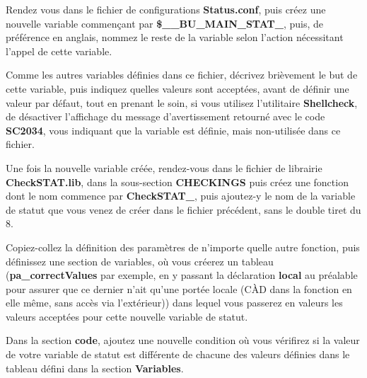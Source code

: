 \documentclass[a4paper,10pt]{article}
\begin{document}
\begin{justify}
    Rendez vous dans le fichier de configurations \textbf{\color{lime}Status.conf}, puis créez une nouvelle variable commençant par \textbf{\color{orange}\$\_\_BU\_MAIN\_STAT\_}, puis, de préférence en anglais, nommez le reste de la variable selon l'action nécessitant l'appel de cette variable.
\end{justify}

\begin{justify}
    Comme les autres variables définies dans ce fichier, décrivez brièvement le but de cette variable, puis indiquez quelles valeurs sont acceptées, avant de définir une valeur par défaut, tout en prenant le soin, si vous utilisez l'utilitaire \textbf{\color{gray}Shellcheck}, de désactiver l'affichage du message d'avertissement retourné avec le code \textbf{SC2034}, vous indiquant que la variable est définie, mais non-utilisée dans ce fichier.
\end{justify}

\begin{justify}
    Une fois la nouvelle variable créée, rendez-vous dans le fichier de librairie \textbf{\color{lime}CheckSTAT.lib}, dans la sous-section \textbf{CHECKINGS} puis créez une fonction dont le nom commence par \textbf{\color{mauve}CheckSTAT\_}, puis ajoutez-y le nom de la variable de statut que vous venez de créer dans le fichier précédent, sans le double tiret du 8.
\end{justify}

\begin{justify}
    Copiez-collez la définition des paramètres de n'importe quelle autre fonction, puis définissez une section de variables, où vous créerez un tableau (\textbf{pa\_correctValues} par exemple, en y passant la déclaration \textbf{\color{gray}local} au préalable pour assurer que ce dernier n'ait qu'une portée locale (CÀD dans la fonction en elle même, sans accès via l'extérieur)) dans lequel vous passerez en valeurs les valeurs acceptées pour cette nouvelle variable de statut.
\end{justify}

\begin{justify}
    Dans la section \textbf{code}, ajoutez une nouvelle condition où vous vérifirez si la valeur de votre variable de statut est différente de chacune des valeurs définies dans le tableau défini dans la section \textbf{Variables}.
\end{justify}
\end{document}
